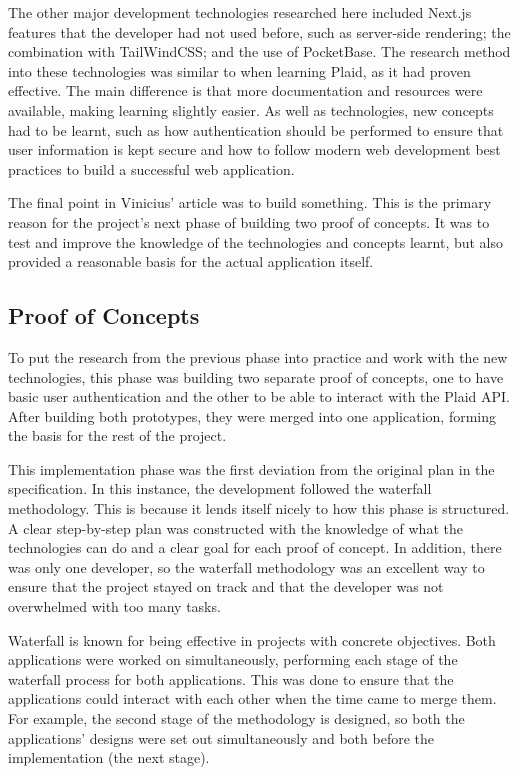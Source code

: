 The other major development technologies researched here included Next.js features that the developer had not used before, such as server-side rendering; the combination with TailWindCSS; and the use of PocketBase. The research method into these technologies was similar to when learning Plaid, as it had proven effective. The main difference is that more documentation and resources were available, making learning slightly easier. As well as technologies, new concepts had to be learnt, such as how authentication should be performed to ensure that user information is kept secure and how to follow modern web development best practices to build a successful web application.

The final point in Vinicius' article was to build something. This is the primary reason for the project's next phase of building two proof of concepts. It was to test and improve the knowledge of the technologies and concepts learnt, but also provided a reasonable basis for the actual application itself.

\subsection{Proof of Concepts}
To put the research from the previous phase into practice and work with the new technologies, this phase was building two separate proof of concepts, one to have basic user authentication and the other to be able to interact with the Plaid API. After building both prototypes, they were merged into one application, forming the basis for the rest of the project.

This implementation phase was the first deviation from the original plan in the specification. In this instance, the development followed the waterfall methodology. This is because it lends itself nicely to how this phase is structured. A clear step-by-step plan was constructed with the knowledge of what the technologies can do and a clear goal for each proof of concept. In addition, there was only one developer, so the waterfall methodology was an excellent way to ensure that the project stayed on track and that the developer was not overwhelmed with too many tasks.

Waterfall is known for being effective in projects with concrete objectives. Both applications were worked on simultaneously, performing each stage of the waterfall process for both applications. This was done to ensure that the applications could interact with each other when the time came to merge them. For example, the second stage of the methodology is designed, so both the applications' designs were set out simultaneously and both before the implementation (the next stage).

